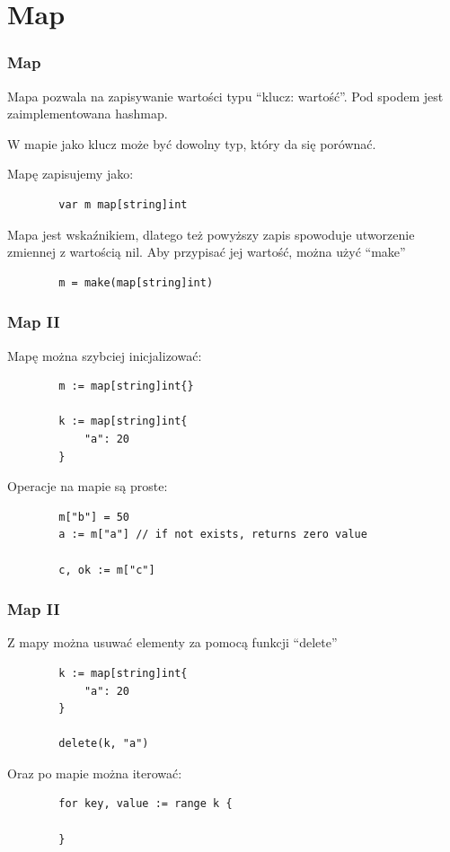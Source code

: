 \documentclass[10pt]{beamer}
\newcommand{\quotes}[1]{``#1''}
\begin{document}
\section[Mapa]{Map}
\begin{frame}[fragile]
    \frametitle{Map}
    Mapa pozwala na zapisywanie wartości typu \quotes{klucz: wartość}. Pod spodem jest
    zaimplementowana hashmap.

    W mapie jako klucz może być dowolny typ, który da się porównać.

    Mapę zapisujemy jako:
    \begin{verbatim}
        var m map[string]int
    \end{verbatim}

    Mapa jest wskaźnikiem, dlatego też powyższy zapis spowoduje utworzenie zmiennej
    z wartością nil. Aby przypisać jej wartość, można użyć \quotes{make}

    \begin{verbatim}
        m = make(map[string]int)
    \end{verbatim}
\end{frame}

\begin{frame}[fragile]
    \frametitle{Map II}
    Mapę można szybciej inicjalizować:

    \begin{verbatim}
        m := map[string]int{}

        k := map[string]int{
            "a": 20
        }
    \end{verbatim}

    Operacje na mapie są proste:
    \begin{verbatim}
        m["b"] = 50
        a := m["a"] // if not exists, returns zero value

        c, ok := m["c"]
    \end{verbatim}
\end{frame}

\begin{frame}[fragile]
    \frametitle{Map II}
    Z mapy można usuwać elementy za pomocą funkcji \quotes{delete}

    \begin{verbatim}
        k := map[string]int{
            "a": 20
        }

        delete(k, "a")
    \end{verbatim}

    Oraz po mapie można iterować:
    \begin{verbatim}
        for key, value := range k {
            
        }
    \end{verbatim}
\end{frame}


\end{document}
